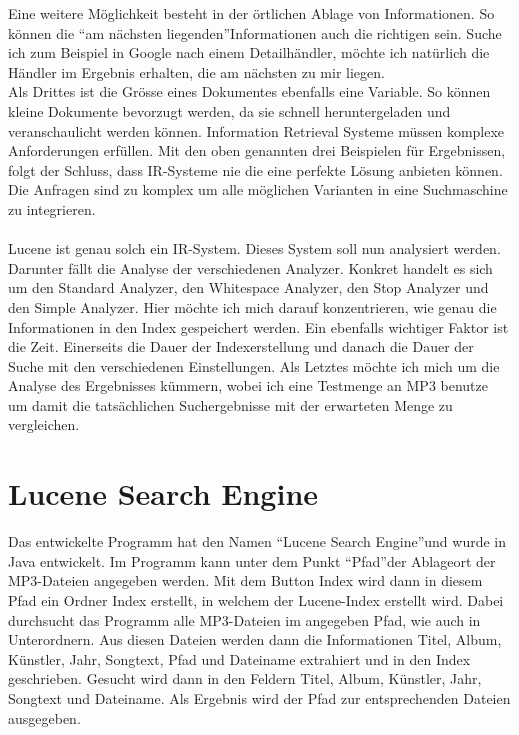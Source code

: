 \documentclass[12pt,a4paper,ngerman]{report}
\begin{document}
Eine weitere Möglichkeit besteht in der örtlichen Ablage von Informationen. So können die \textquotedblleft am nächsten liegenden\textquotedblright Informationen auch die richtigen sein. Suche ich zum Beispiel in Google nach einem Detailhändler, möchte ich natürlich die Händler im Ergebnis erhalten, die am nächsten zu mir liegen.\\
Als Drittes ist die Grösse eines Dokumentes ebenfalls eine Variable. So können kleine Dokumente bevorzugt werden, da sie schnell heruntergeladen und veranschaulicht werden können.
\newpage
Information Retrieval Systeme müssen komplexe Anforderungen erfüllen. Mit den oben genannten drei Beispielen für Ergebnissen, folgt der Schluss, dass IR-Systeme nie die eine perfekte Lösung anbieten können. Die Anfragen sind zu komplex um alle möglichen Varianten in eine Suchmaschine zu integrieren.\\
\\
Lucene ist genau solch ein IR-System. Dieses System soll nun analysiert werden. Darunter fällt die Analyse der verschiedenen Analyzer. Konkret handelt es sich um den Standard Analyzer, den Whitespace Analyzer, den Stop Analyzer und den Simple Analyzer. Hier möchte ich mich darauf konzentrieren, wie genau die Informationen in den Index gespeichert werden. Ein ebenfalls wichtiger Faktor ist die Zeit. Einerseits die Dauer der Indexerstellung und danach die Dauer der Suche mit den verschiedenen Einstellungen. Als Letztes möchte ich mich um die Analyse des Ergebnisses kümmern, wobei ich eine Testmenge an MP3 benutze um damit die tatsächlichen Suchergebnisse mit der erwarteten Menge zu vergleichen.
\section{Lucene Search Engine}
Das entwickelte Programm hat den Namen \textquotedblleft Lucene Search Engine\textquotedblright und wurde in Java entwickelt. Im Programm kann unter dem Punkt \textquotedblleft Pfad\textquotedblright der Ablageort der MP3-Dateien angegeben werden. Mit dem Button Index wird dann in diesem Pfad ein Ordner Index erstellt, in welchem der Lucene-Index erstellt wird. Dabei durchsucht das Programm alle MP3-Dateien im angegeben Pfad, wie auch in Unterordnern. Aus diesen Dateien werden dann die Informationen Titel, Album, Künstler, Jahr, Songtext, Pfad und Dateiname extrahiert und in den Index geschrieben. Gesucht wird dann in den Feldern Titel, Album, Künstler, Jahr, Songtext und Dateiname. Als Ergebnis wird der Pfad zur entsprechenden Dateien ausgegeben.
\newpage
\end{document}
